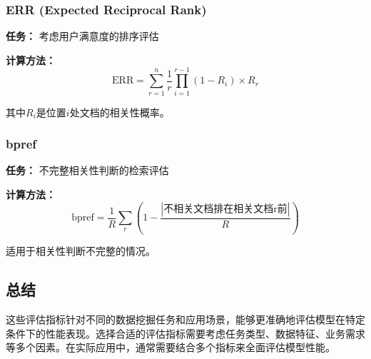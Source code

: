 \documentclass[a4paper]{article}
\begin{document}
\subsubsection{ERR (Expected Reciprocal Rank)}
\textbf{任务：} 考虑用户满意度的排序评估

\textbf{计算方法：}
$$\text{ERR} = \sum_{r=1}^{n} \frac{1}{r} \prod_{i=1}^{r-1} (1 - R_i) \times R_r$$

其中$R_i$是位置$i$处文档的相关性概率。

\subsubsection{bpref}
\textbf{任务：} 不完整相关性判断的检索评估

\textbf{计算方法：}
$$\text{bpref} = \frac{1}{R} \sum_{r} \left(1 - \frac{|\text{不相关文档排在相关文档r前}|}{R}\right)$$

适用于相关性判断不完整的情况。

\subsection{总结}

这些评估指标针对不同的数据挖掘任务和应用场景，能够更准确地评估模型在特定条件下的性能表现。选择合适的评估指标需要考虑任务类型、数据特征、业务需求等多个因素。在实际应用中，通常需要结合多个指标来全面评估模型性能。
\end{document}
